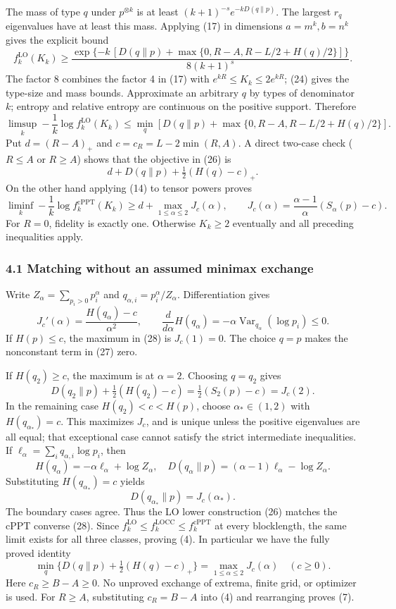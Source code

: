 \documentclass[11pt]{article}
\begin{document}
The mass of type \(q\) under \(p^{\otimes k}\) is at least \((k+1)^{-s}e^{-kD(q\|p)}\). The largest \(r_q\) eigenvalues have at least this mass. Applying (17) in dimensions \(a=m^k,b=n^k\) gives the explicit bound \[
 f_k^{\mathrm{LO}}(K_k) \ge
 \frac{\exp\{-k\,[D(q\|p)+\max\{0,R-A,R-L/2+H(q)/2\}]\}}{8(k+1)^s}.
 \tag{25}
\] The factor 8 combines the factor 4 in (17) with \(e^{kR}\le K_k\le2e^{kR}\); (24) gives the type-size and mass bounds. Approximate an arbitrary \(q\) by types of denominator \(k\); entropy and relative entropy are continuous on the positive support. Therefore \[
 \limsup_k-\frac1k\log f_k^{\mathrm{LO}}(K_k)
 \le \min_q\left[D(q\|p)+\max\{0,R-A,R-L/2+H(q)/2\}\right].
 \tag{26}
\] Put \(d=(R-A)_+\) and \(c=c_R=L-2\min(R,A)\). A direct two-case check (\(R\le A\) or \(R\ge A\)) shows that the objective in (26) is \[
 d+D(q\|p)+\tfrac12(H(q)-c)_+.
 \tag{27}
\] On the other hand applying (14) to tensor powers proves \[
 \liminf_k-\frac1k\log f_k^{\mathrm{cPPT}}(K_k)
 \ge d+\max_{1\le\alpha\le2}J_c(\alpha),\qquad
 J_c(\alpha)=\frac{\alpha-1}{\alpha}(S_\alpha(p)-c).
 \tag{28}
\] For \(R=0\), fidelity is exactly one. Otherwise \(K_k\ge2\) eventually and all preceding inequalities apply.

\hypertarget{matching-without-an-assumed-minimax-exchange}{%
\subsubsection{4.1 Matching without an assumed minimax exchange}\label{matching-without-an-assumed-minimax-exchange}}

Write \(Z_\alpha=\sum_{p_i>0}p_i^\alpha\) and \(q_{\alpha,i}=p_i^\alpha/Z_\alpha\). Differentiation gives \[
 J_c'(\alpha)=\frac{H(q_\alpha)-c}{\alpha^2},\qquad
 \frac{d}{d\alpha}H(q_\alpha)=-\alpha\operatorname{Var}_{q_\alpha}(\log p_i)\le0.
 \tag{29}
\] If \(H(p)\le c\), the maximum in (28) is \(J_c(1)=0\). The choice \(q=p\) makes the nonconstant term in (27) zero.

If \(H(q_2)\ge c\), the maximum is at \(\alpha=2\). Choosing \(q=q_2\) gives \[
 D(q_2\|p)+\tfrac12(H(q_2)-c)=\tfrac12(S_2(p)-c)=J_c(2).
 \tag{30}
\] In the remaining case \(H(q_2)<c<H(p)\), choose \(\alpha_*\in(1,2)\) with \(H(q_{\alpha_*})=c\). This maximizes \(J_c\), and is unique unless the positive eigenvalues are all equal; that exceptional case cannot satisfy the strict intermediate inequalities. If \(\ell_\alpha=\sum_iq_{\alpha,i}\log p_i\), then \[
 H(q_\alpha)=-\alpha\ell_\alpha+\log Z_\alpha,\quad
 D(q_\alpha\|p)=(\alpha-1)\ell_\alpha-\log Z_\alpha.
\] Substituting \(H(q_{\alpha_*})=c\) yields \[
 D(q_{\alpha_*}\|p)=J_c(\alpha_*).
 \tag{31}
\] The boundary cases agree. Thus the LO lower construction (26) matches the cPPT converse (28). Since \(f_k^{\mathrm{LO}}\le f_k^{\mathrm{LOCC}}\le f_k^{\mathrm{cPPT}}\) at every blocklength, the same limit exists for all three classes, proving (4). In particular we have the fully proved identity \[
 \min_q\{D(q\|p)+\tfrac12(H(q)-c)_+\}
 =\max_{1\le\alpha\le2}J_c(\alpha)\quad(c\ge0).
 \tag{32}
\] Here \(c_R\ge B-A\ge0\). No unproved exchange of extrema, finite grid, or optimizer is used. For \(R\ge A\), substituting \(c_R=B-A\) into (4) and rearranging proves (7).
\end{document}
